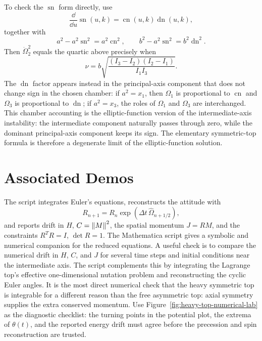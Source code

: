 To check the \(\operatorname{sn}\) form directly, use
\[
  \frac{\dd}{\dd u}\operatorname{sn}(u,k)
  =
  \operatorname{cn}(u,k)\operatorname{dn}(u,k),
\]
together with
\[
  a^2-a^2\operatorname{sn}^2=a^2\operatorname{cn}^2,
  \qquad
  b^2-a^2\operatorname{sn}^2=b^2\operatorname{dn}^2.
\]
Then \(\dot\Omega_2^2\) equals the quartic above precisely when
\[
  \nu=b\sqrt{\frac{(I_3-I_2)(I_2-I_1)}{I_1I_3}}.
\]
The \(\operatorname{dn}\) factor appears instead in the principal-axis
component that does not change sign in the chosen chamber: if \(a^2=x_1\), then
\(\Omega_1\) is proportional to \(\operatorname{cn}\) and \(\Omega_3\) is
proportional to \(\operatorname{dn}\); if \(a^2=x_3\), the roles of
\(\Omega_1\) and \(\Omega_3\) are interchanged. This chamber accounting is the
elliptic-function version of the intermediate-axis instability: the
intermediate component naturally passes through zero, while the dominant
principal-axis component keeps its sign.
The elementary symmetric-top formula is therefore a
degenerate limit of the elliptic-function solution.

\section{Associated Demos}
\label{sec:rigid-associated-demos}

The script  integrates Euler's
equations, reconstructs the attitude with
\[
  R_{n+1}=R_n\exp(\Delta t\,\widehat\Omega_{n+1/2}),
\]
and reports drift in \(H\), \(C=\left\lVert M\right\rVert^2\), the spatial momentum
\(J=RM\), and the constraints \(R^TR=I\), \(\det R=1\). The Mathematica script
 gives a symbolic and numerical
companion for the reduced equations. A useful check is to compare the numerical
drift in \(H\), \(C\), and \(J\) for several time steps and initial conditions
near the intermediate axis.
The script  complements this by
integrating the Lagrange top's effective one-dimensional nutation problem and
reconstructing the cyclic Euler angles.  It is the most direct numerical check
that the heavy symmetric top is integrable for a different reason than the
free asymmetric top: axial symmetry supplies the extra conserved momentum.
Use Figure~\ref{fig:heavy-top-numerical-lab} as the diagnostic checklist: the
turning points in the potential plot, the extrema of \(\theta(t)\), and the
reported energy drift must agree before the precession and spin reconstruction
are trusted.
